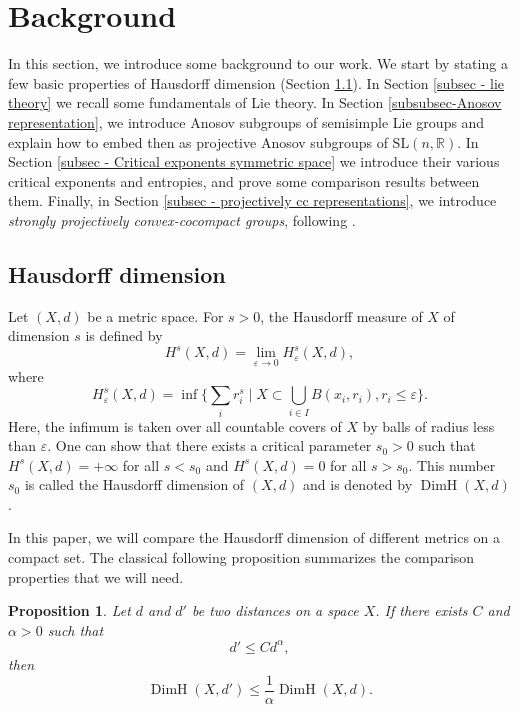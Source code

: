 \documentclass[11pt]{article}
\numberwithin{equation}{section}
\newtheorem{prop}[theo]{Proposition}
\theoremstyle{definition}
\newcommand{\R}{\mathbb{R}}
\newcommand{\SL}{\mathrm{SL}}
\DeclareMathOperator{\DimH}{DimH}
\let\epsilon\varepsilon
\begin{document}
\section{Background} \label{sec - Background}

In this section, we introduce some background to our work. We start by stating a few basic properties of Hausdorff dimension (Section \ref{subsec - hausdorff dimension}). In Section \ref{subsec - lie theory} we recall some fundamentals of Lie theory. In Section \ref{subsubsec-Anosov representation}, we introduce Anosov subgroups of semisimple Lie groups and explain how to embed then as projective Anosov subgroups of $\SL(n,\R)$. In Section \ref{subsec - Critical exponents symmetric space} we introduce their various critical exponents and entropies, and prove some comparison results between them. Finally, in Section \ref{subsec - projectively cc representations}, we introduce \emph{strongly projectively convex-cocompact groups}, following \cite{DGK}.

\subsection{Hausdorff dimension} \label{subsec - hausdorff dimension}

Let $(X,d)$ be a metric space. For $s>0$, the Hausdorff measure of $X$ of dimension $s$ is defined by\vspace*{-3pt}
\[H^s(X,d) = \lim_{\epsilon\to 0} H^s_\epsilon(X,d),\]
where\vspace*{-3pt}
\[\textstyle
H^s_\epsilon(X,d) = \inf \bigl\{ \sum_i r_i^s \mid X \subset \bigcup_{i\in I} B(x_i, r_i), r_i \leq \epsilon\bigr\}.\]
Here, the infimum is taken over all countable covers of $X$ by balls of radius less than $\epsilon$.
One can show that there exists a critical parameter $s_0>0$ such that $H^s(X,d) = +\infty$ for all $s<s_0$ and $H^s(X,d) = 0$ for all $s>s_0$. This number $s_0$ is called the Hausdorff dimension of $(X,d)$ and is denoted by $\DimH(X,d)$.

In this paper, we will compare the Hausdorff dimension of different metrics on a compact set. The classical following proposition summarizes the comparison properties that we will need.
\begin{prop} \label{p:GeneralComparisonHDim}
Let $d$ and $d'$ be two distances on a space $X$. If there exists $C$ and $\alpha>0$ such that
\[d' \leq C d^{\alpha},\]
then
\[\DimH(X,d') \leq \frac{1}{\alpha} \DimH(X,d).\]
\end{prop}
\end{document}
